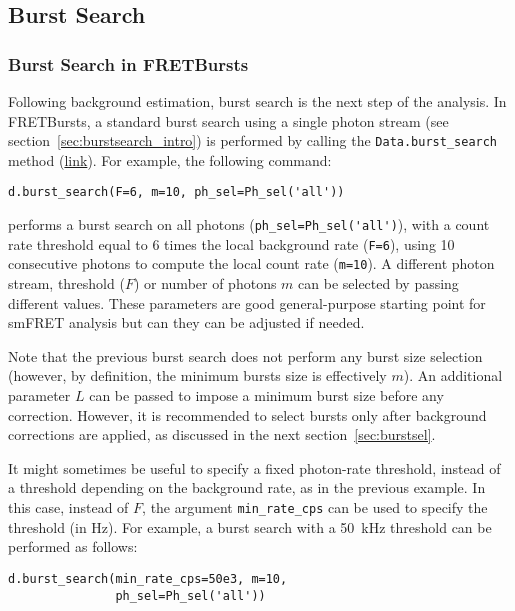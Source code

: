\subsection{Burst Search}
\label{sec:burstsearch}

\subsubsection{Burst Search in FRETBursts}
\label{sec:burstsearch_code}

Following background estimation, burst search is the next step of
the analysis.
In FRETBursts, a standard burst search using a single photon stream
(see section~\ref{sec:burstsearch_intro}) is performed by calling the
\verb|Data.burst_search| method
(\href{http://fretbursts.readthedocs.org/en/latest/data_class.html#fretbursts.burstlib.Data.burst_search}{link}).
For example, the following command:

\begin{lstlisting}
d.burst_search(F=6, m=10, ph_sel=Ph_sel('all'))
\end{lstlisting}

performs a burst search on all photons
(\verb|ph_sel=Ph_sel('all')|), with a count rate threshold equal to 6 times the
local background rate (\verb|F=6|), using 10 consecutive photons to compute the
local count rate (\verb|m=10|).
A different photon stream, threshold ($F$) or number of photons $m$ can be selected 
by passing different values. 
These parameters are good general-purpose starting point for smFRET analysis 
but can they can be adjusted if needed.

Note that the previous burst search does not perform any burst size selection 
(however, by definition, the minimum bursts size is effectively $m$).
An additional parameter $L$ can be passed to impose a minimum burst
size before any correction.
However, it is recommended to select bursts only after background corrections
are applied, as discussed in the next section~\ref{sec:burstsel}.

It might sometimes be useful to specify a fixed photon-rate threshold, instead
of a threshold depending on the background rate, as in the previous example. In
this case, instead of $F$, the argument \verb|min_rate_cps| can be used to
specify the threshold (in Hz). For example, a burst search with a 50~kHz
threshold can be performed as follows:

\begin{lstlisting}
d.burst_search(min_rate_cps=50e3, m=10, 
               ph_sel=Ph_sel('all'))
\end{lstlisting}


